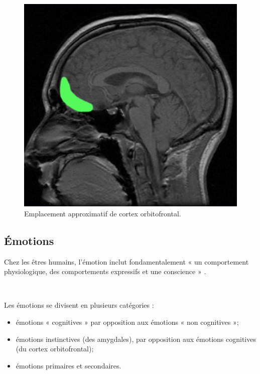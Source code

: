\begin{figure}[th]
\centering
\includegraphics{Figures/3}
\decoRule
\caption[Cortex Orbifrontal]{Emplacement approximatif de cortex orbitofrontal.}
\label{fig:cortex}
\end{figure}


\subsection{Émotions}

Chez les êtres humains, l'émotion inclut fondamentalement « un comportement physiologique, des comportements expressifs et une conscience » \parencite{myers2004theories}.

~\par
Les émotions se divisent en plusieurs catégories :

\begin{itemize}
\item émotions « cognitives » par opposition aux émotions « non cognitives »;
\item émotions instinctives (des amygdales), par opposition aux émotions cognitives (du cortex orbitofrontal);
\item émotions primaires et secondaires.
\end{itemize}

~\par

